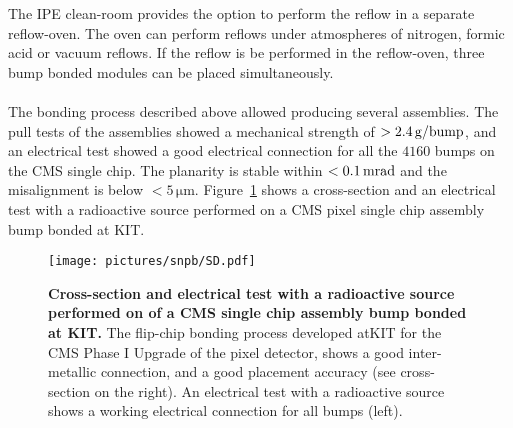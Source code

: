 The \ac{IPE} clean-room provides the option to perform the reflow in a separate reflow-oven. The oven can perform reflows under atmospheres of nitrogen, formic acid or vacuum reflows. If the reflow is be performed in the reflow-oven, three bump bonded modules can be placed simultaneously.
\\
\\The bonding process described above allowed producing several assemblies. The pull tests of the assemblies showed a mechanical strength of $>2.4\,\rm{g/bump}$, and an electrical test showed a good electrical connection for all the $4160$ bumps on the \ac{CMS} single chip. The planarity is stable within $<0.1\,\rm{mrad}$ and the misalignment is below $<5\,\si{\micro \meter}$. Figure~\ref{pic:SnPb_cross_source} shows a cross-section and an electrical test with a radioactive source performed on a \ac{CMS} pixel single chip assembly bump bonded at \ac{KIT}.
\begin{figure}
\begin{center}
\texttt{[image: pictures/snpb/SD.pdf]}
\end{center}
\caption[Cross-section and electrical test of a CMS single chip assembly bump bonded at KIT]{\textbf{Cross-section and electrical test with a radioactive source performed on of a \ac{CMS} single chip assembly bump bonded at \ac{KIT}.} The flip-chip bonding process developed at\ac{KIT} for the \ac{CMS} Phase I Upgrade of the pixel detector, shows a good inter-metallic connection, and a good placement accuracy (see cross-section on the right). An electrical test with a radioactive source shows a working electrical connection for all bumps (left). }\label{pic:SnPb_cross_source}
\end{figure}
